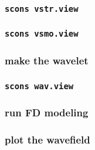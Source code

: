\begin{frame} \frametitle{\texttt{scons vstr.view}}
\end{frame}
\begin{frame} \frametitle{\texttt{scons vsmo.view}}
\end{frame}

\begin{frame} \frametitle{make the wavelet}
\end{frame}
\cwpnote{}

\begin{frame} \frametitle{\texttt{scons wav.view}}
\end{frame}

\begin{frame} \frametitle{run FD modeling}
\end{frame}
\cwpnote{}

\begin{frame} \frametitle{plot the wavefield}
\end{frame}
\cwpnote{}

